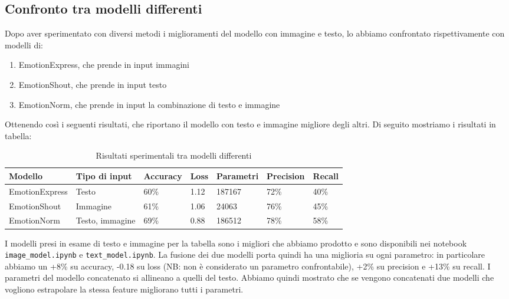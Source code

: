 \documentclass{article}
\begin{document}
\subsection{Confronto tra modelli differenti}

Dopo aver sperimentato con diversi metodi i miglioramenti del modello con immagine e testo, lo abbiamo confrontato rispettivamente con modelli di:
\begin{enumerate}
    \item EmotionExpress, che prende in input immagini
    \item EmotionShout, che prende in input testo
    \item EmotionNorm, che prende in input la combinazione di testo e immagine
\end{enumerate}

Ottenendo così i seguenti risultati, che riportano il modello con testo e immagine migliore degli altri. Di seguito mostriamo i risultati in tabella:


\begin{table}[H]
\begin{adjustwidth}{-0.5cm}{}
\centering
\begin{tabular}{@{}lllllll@{}}
\toprule
\textbf{Modello} & 
\textbf{Tipo di input} & 
\textbf{Accuracy} &
\textbf{Loss} &
\textbf{Parametri} &
\textbf{Precision} &
\textbf{Recall}
\\ \midrule
EmotionExpress & Testo & 60\%  & 1.12 & 187167  & 72\% & 40\%  \\
EmotionShout & Immagine & 61\% & 1.06 & 24063 & 76\% & 45\% \\
EmotionNorm & Testo, immagine & 69\% & 0.88 & 186512 & 78\% & 58\% \\
\bottomrule
\end{tabular}
\caption{Risultati sperimentali tra modelli differenti}
\label{tab:results}
\end{adjustwidth}
\end{table}


I modelli presi in esame di testo e immagine per la tabella sono i migliori che abbiamo prodotto e sono disponibili nei notebook \verb|image_model.ipynb| e \verb|text_model.ipynb|. La fusione dei due modelli porta quindi ha una miglioria su ogni parametro: in particolare abbiamo un +8\% su accuracy, -0.18 su loss (NB: non è considerato un parametro confrontabile), +2\% su precision e +13\% su recall. I parametri del modello concatenato si allineano a quelli del testo. Abbiamo quindi mostrato che se vengono concatenati due modelli che vogliono estrapolare la stessa feature migliorano tutti i parametri.
\end{document}
